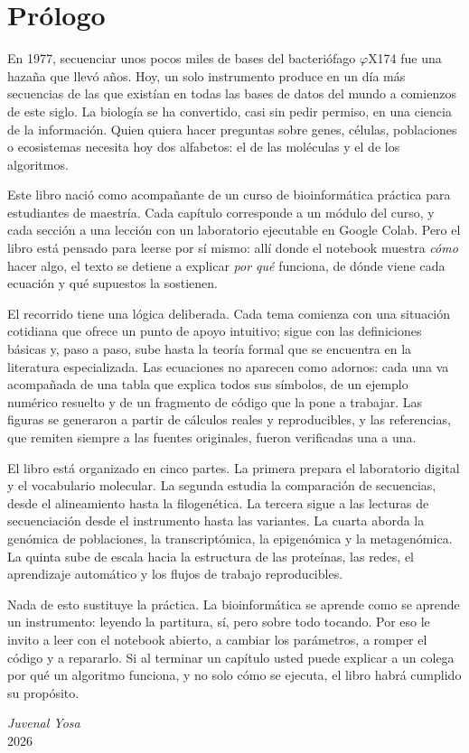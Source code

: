 \chapter*{Prólogo}

En 1977, secuenciar unos pocos miles de bases del bacteriófago $\varphi$X174 fue una hazaña que
llevó años. Hoy, un solo instrumento produce en un día más secuencias de las que existían en todas
las bases de datos del mundo a comienzos de este siglo. La biología se ha convertido, casi sin
pedir permiso, en una ciencia de la información. Quien quiera hacer preguntas sobre genes, células,
poblaciones o ecosistemas necesita hoy dos alfabetos: el de las moléculas y el de los algoritmos.

Este libro nació como acompañante de un curso de bioinformática práctica para estudiantes de
maestría. Cada capítulo corresponde a un módulo del curso, y cada sección a una lección con un
laboratorio ejecutable en Google Colab. Pero el libro está pensado para leerse por sí mismo: allí
donde el notebook muestra \emph{cómo} hacer algo, el texto se detiene a explicar \emph{por qué}
funciona, de dónde viene cada ecuación y qué supuestos la sostienen.

El recorrido tiene una lógica deliberada. Cada tema comienza con una situación cotidiana que
ofrece un punto de apoyo intuitivo; sigue con las definiciones básicas y, paso a paso, sube hasta
la teoría formal que se encuentra en la literatura especializada. Las ecuaciones no aparecen como
adornos: cada una va acompañada de una tabla que explica todos sus símbolos, de un ejemplo
numérico resuelto y de un fragmento de código que la pone a trabajar. Las figuras se generaron a
partir de cálculos reales y reproducibles, y las referencias, que remiten siempre a las fuentes
originales, fueron verificadas una a una.

El libro está organizado en cinco partes. La primera prepara el laboratorio digital y el
vocabulario molecular. La segunda estudia la comparación de secuencias, desde el alineamiento
hasta la filogenética. La tercera sigue a las lecturas de secuenciación desde el instrumento hasta
las variantes. La cuarta aborda la genómica de poblaciones, la transcriptómica, la epigenómica y
la metagenómica. La quinta sube de escala hacia la estructura de las proteínas, las redes, el
aprendizaje automático y los flujos de trabajo reproducibles.

Nada de esto sustituye la práctica. La bioinformática se aprende como se aprende un instrumento:
leyendo la partitura, sí, pero sobre todo tocando. Por eso le invito a leer con el notebook abierto,
a cambiar los parámetros, a romper el código y a repararlo. Si al terminar un capítulo usted puede
explicar a un colega por qué un algoritmo funciona, y no solo cómo se ejecuta, el libro habrá
cumplido su propósito.

\bigskip
\begin{flushright}
{\itshape Juvenal Yosa}\\
{\sffamily\small\color{gris}2026}
\end{flushright}

